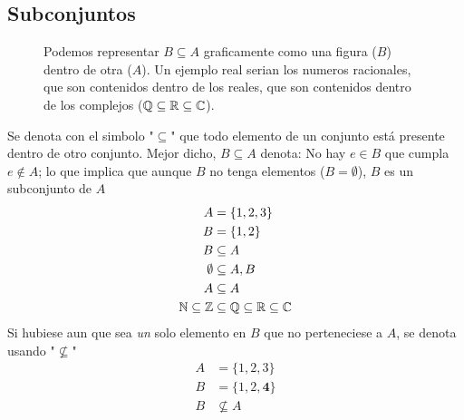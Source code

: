\documentclass[../teoria.root.tex]{subfiles}
\begin{document}
\subsection{Subconjuntos}

\begin{figure}
    \centering
    \caption{
        Podemos representar $B \subseteq A$ graficamente como una figura ($B$) dentro de otra ($A$).
        Un ejemplo real serian los numeros racionales,
        que son contenidos dentro de los reales, que son contenidos dentro de los complejos ($\mathbb{Q} \subseteq \mathbb{R} \subseteq \mathbb{C}$).
    }
\end{figure}

Se denota con el simbolo "$\subseteq$" que todo elemento de un conjunto está presente dentro de otro conjunto.
Mejor dicho, $B \subseteq A$ denota: No hay $e \in B$ que cumpla $e \notin A$; lo que implica que aunque $B$ no tenga
elementos ($B = \emptyset$), $B$ es un subconjunto de $A$
\begin{align*}
    A               & = \{ 1, 2, 3 \}                        \\
    B               & = \{ 1, 2 \}                           \\
    B               & \subseteq A                            \\
    \emptyset       & \subseteq A, B                         \\
    A               & \subseteq A                            \\
    \mathbb{N} \subseteq \mathbb{Z} & \subseteq \mathbb{Q} \subseteq \mathbb{R} \subseteq \mathbb{C} \\
\end{align*}
Si hubiese aun que sea \textit{un} solo elemento en $B$ que no perteneciese a $A$, se denota usando "$\nsubseteq$"
\begin{align*}
    A & = \{ 1, 2, 3 \}          \\
    B & = \{ 1, 2, \textbf{4} \} \\
    B & \nsubseteq A
\end{align*}
\end{document}
